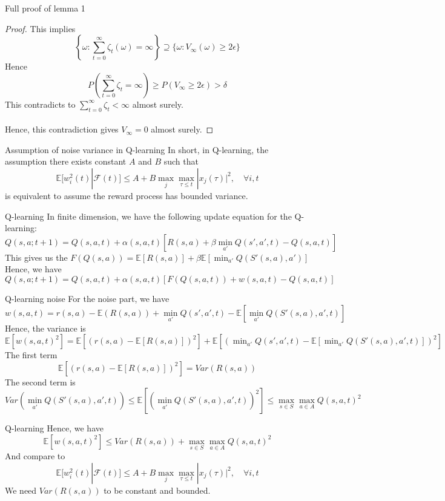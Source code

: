 \documentclass[aspectratio=169]{beamer} %
\begin{document}
\begin{frame}{Full proof of lemma 1}
\begin{proof}
    This implies 
$$
\left\{\omega: \sum_{t=0}^\infty \zeta_t(\omega)=\infty\right\}\supseteq \{\omega: V_\infty(\omega)\ge 2\epsilon\}
$$
Hence
$$
P\left(\sum_{t=0}^\infty \zeta_t =  \infty\right) \ge P\left(V_\infty \ge 2\epsilon\right)>\delta
$$
This contradicts to $\sum_{t=0}^\infty \zeta_t<\infty$ almost surely.\\
\\
Hence, this contradiction gives $V_\infty =0$ almost surely.
\end{proof}
    
\end{frame}
\begin{frame}{Assumption of noise variance in Q-learning}
In short, in Q-learning, the assumption there exists constant $A$ and $B$ such that 
$$
\mathbb{E}[w_i^2(t)|\mathcal{F}(t)]\le A +B\max_j\max_{\tau\le t}|x_j(\tau)|^2,\quad \forall i,t
$$
is equivalent to assume the reward process has bounded variance.
\end{frame}
\begin{frame}{Q-learning}
In finite dimension, we have the following update equation for the Q-learning:
$$
Q(s,a;t+1)  =Q (s,a,t) +\alpha(s,a,t) [R(s,a)+ \beta \min_{a'} Q(s',a',t)-Q(s,a,t)]
$$
This gives us the $F(Q(s,a)) = \mathbb{E}[R(s,a)]+\beta \mathbb{E}\left[\min_{a'} Q(S'(s,a),a'
)\right]$
Hence, we have
$$
Q(s,a;t+1)  =Q (s,a,t) +\alpha(s,a,t) [F(Q(s,a,t))+w(s,a,t)-Q(s,a,t)]
$$
\end{frame}
\begin{frame}{Q-learning noise}
For the noise part, we have
$$
w(s,a,t) = r(s,a)-\mathbb{E}(R(s,a))+\min_{a'} Q(s',a',t) -\mathbb{E}\left[\min_{a'}Q(S'(s,a),a',t)\right]
$$
Hence, the variance is
$\mathbb{E}[w(s,a,t)^2]= \mathbb{E}[(r(s,a)-\mathbb{E}[R(s,a)])^2]+\mathbb{E}[(\min_{a'} Q(s',a',t)-\mathbb{E}[\min_{a'} Q(S'(s,a),a',t)])^2]$
The first term
$$
\mathbb{E}[(r(s,a)-\mathbb{E}[R(s,a)])^2] = Var(R(s,a))
$$
The second term is 
$$
Var(\min_{a'} Q(S'(s,a),a',t))\le \mathbb{E}[(\min_{a'}Q(S'(s,a),a',t))^2]\le \max_{s\in S}\max_{a\in A}Q(s,a,t)^2
$$

\end{frame}
\begin{frame}{Q-learning}
Hence, we have
$$
\mathbb{E}[w(s,a,t)^2]\le Var(R(s,a))+ \max_{s\in S}\max_{a\in A}Q(s,a,t)^2
$$
And compare to 
    $$
\mathbb{E}[w_i^2(t)|\mathcal{F}(t)]\le A +B\max_j\max_{\tau\le t}|x_j(\tau)|^2,\quad \forall i,t
$$
We need 
$Var(R(s,a))$ to be constant and bounded.
\end{frame}
\end{document}
